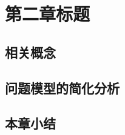 \chapter{第二章标题}


\section{相关概念} \label{sec:2-background}



\section{问题模型的简化分析}\label{sec:2-reduction}


\section{本章小结}
